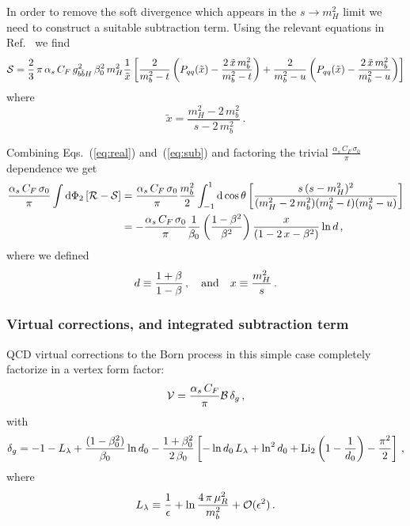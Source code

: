 In order to remove the soft divergence which appears in the  $s\rightarrow
m_H^2$ limit we need to construct a suitable  subtraction term. Using
the relevant 
equations in Ref.~\cite{Krauss:2017wmx} we find
\begin{equation}
  \label{eq:sub}
  {\cal S} =
  \frac{2}{3}\,\pi \,\alpha_s\,C_F\,g_{b\bar{b}H}^2\,\beta_0^2\,m_H^2
  \frac{1}{\tilde{x}}
  \left[\frac{2}{m_b^2-t}\left( P_{qq}(\tilde{x})-\frac{2\,\tilde{x}\,m_b^2}{m_b^2-t} \right)
    +\frac{2}{m_b^2-u}\left( P_{qq}(\tilde{x})-\frac{2\,\tilde{x}\,m_b^2}{m_b^2-u} \right)\right]
\end{equation}
where
\begin{equation}
  \tilde{x} = \frac{m_H^2-2\,m_b^2}{s-2\,m_b^2}\,.
\end{equation}

Combining Eqs.~(\ref{eq:real}) and~(\ref{eq:sub}) and factoring
the trivial $\frac{\alpha_s\,C_F\,\sigma_0}{\pi}$ dependence we get
\begin{equation}
  \begin{split}
    \frac{\alpha_s\,C_F\,\sigma_0}{\pi}
    \int{\rm d}\Phi_2 \left[{\cal R} -{\cal S}\right] & =
    \frac{\alpha_s\,C_F\,\sigma_0}{\pi}\frac{m_b^2}{2}
    \int_{-1}^1{\rm d}\cos\theta
    \left[\frac{s\,(s-m_H^2)^2}{(m_H^2-2\,m_b^2)(m_b^2-t)(m_b^2-u)}
    \right]\\
    & = -\frac{\alpha_s\,C_F\,\sigma_0}{\pi}
    \frac{1}{\beta_0}\left(\frac{ 1-\beta^2 }{\beta^2}\right)
    \frac{x}{\left( 1 - 2\,x - \beta^2\right)}\ln d\,,
  \end{split}
\end{equation}
where we defined
\begin{equation}
  d \equiv \frac{1+\beta}{1-\beta}\,,
  \quad {\rm and}\quad x\equiv \frac{m_H^2}{s}\,.
\end{equation}

\subsubsection{Virtual corrections, and integrated subtraction term}
QCD virtual corrections to the Born process in this simple case
completely factorize in a vertex form factor:
\begin{equation}
  {\cal V} = \frac{\alpha_s\,C_F}{\pi}{\cal B}\,\delta_g\,,
\end{equation}
with
\begin{equation}
  \delta_g = -1 - L_{\lambda} +
  \frac{(1-\beta_0^2)}{\beta_0} \ln d_0 
  - \frac{1+\beta_0^2}{2\,\beta_0}\left[-\ln d_0\,L_{\lambda} + \ln^2d_0+{\rm Li}_2\left(
      1-\frac{1}{d_0} \right) -\frac{\pi^2}{2} \right]\,,
\end{equation}
where
\begin{equation}
  L_{\lambda} \equiv \frac{1}{\epsilon} + \ln\frac{4\,\pi\,\mu_R^2}{m_b^2}
  +{\cal O}(\epsilon^2)\,.
\end{equation}

